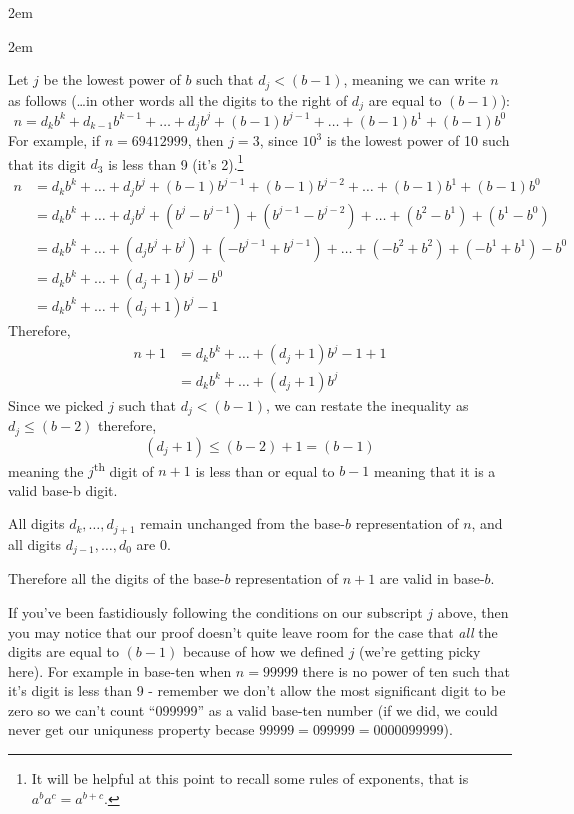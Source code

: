 \documentclass{article}
\newenvironment{jprIn}{\begin{adjustwidth}{2em}{}}{\end{adjustwidth}}
\begin{document}
\begin{jprIn}
\begin{jprIn}

Let $j$ be the lowest power of $b$ such that $d_j<(b-1)$,
meaning we can write $n$ as follows (\dots{}in other words all the digits to the right of $d_j$ are equal to $(b-1)$):
\[n = d_kb^k+d_{k-1}b^{k-1}+\dots+d_jb^j+(b-1)b^{j-1}+\dots+(b-1)b^1+(b-1)b^0\]
For example,
if $n=69412999$,
then $j=3$,
since $10^3$ is the lowest power of 10 such that its digit $d_3$ is less than 9 (it's 2).\footnote{It will
be helpful at this point to recall some rules of exponents, that is $a^ba^c=a^{b+c}$.}
\begin{align*}
n &=d_kb^k+\dots+d_jb^j+(b-1)b^{j-1}+(b-1)b^{j-2}+\dots+(b-1)b^1+(b-1)b^0\\
&= d_kb^k+\dots+d_jb^j+(b^j-b^{j-1})+(b^{j-1}-b^{j-2})+\dots+(b^2-b^1)+(b^1-b^0)\\
&= d_kb^k+\dots+(d_jb^j+b^j)+(-b^{j-1}+b^{j-1})+\dots+(-b^2+b^2)+(-b^1+b^1)-b^0\\
&= d_kb^k+\dots+(d_j+1)b^j-b^0\\
&= d_kb^k+\dots+(d_j+1)b^j-1
\end{align*}
Therefore,
\begin{align}
n+1 &=d_kb^k+\dots+(d_j+1)b^j-1+1 \nonumber \\
&= d_kb^k+\dots+(d_j+1)b^j \label{eqnA}
\end{align}
Since we picked $j$ such that $d_j<(b-1)$,
we can restate the inequality as\\
$d_j\le(b-2)$ therefore,
\[(d_j+1)\le(b-2)+1=(b-1)\]
meaning the $j$\textsuperscript{th} digit of $n+1$ is less than or equal to $b-1$ meaning that it is a valid base-b digit.

All digits $d_k,\dots,{}d_{j+1}$ remain unchanged from the base-$b$ representation of $n$,
and all digits $d_{j-1},\dots{},d_0$ are 0.

Therefore all the digits of the base-$b$ representation of $n+1$ are valid in base-$b$.
\bigskip

If you've been fastidiously following the conditions on our subscript $j$ above, then
you may notice that
our proof doesn't quite leave room for the case that \emph{all} the digits are equal to $(b-1)$ because of
how we defined $j$ (we're getting picky here). For example in base-ten when $n=99999$ there is no power of ten such that
it's digit is less than 9 - remember we don't allow the most significant digit to be zero so we can't count 
``099999'' as a valid base-ten number  (if we did, we could never get our uniquness property becase $99999 = 099999 = 0000099999$).


\end{jprIn}
\end{jprIn}
\end{document}
